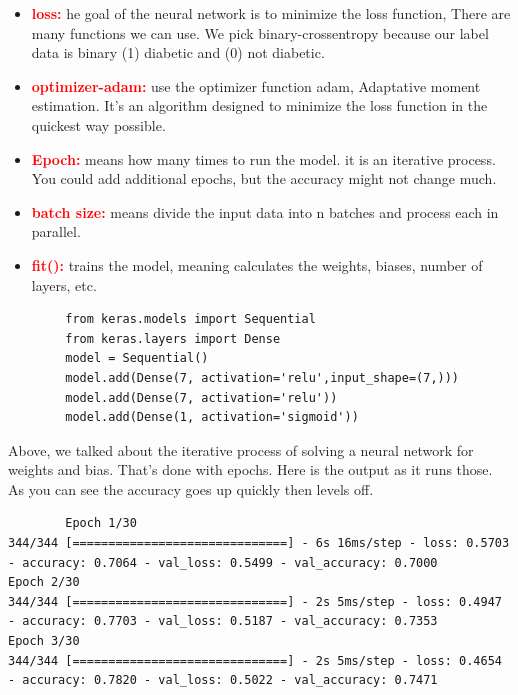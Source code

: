     \begin{itemize}
        \item \textbf{\textcolor{red}{\Large loss:}}
        he goal of the neural network is to minimize the loss function,
        There are many functions we can use. We pick binary-crossentropy 
        because our label data is binary (1) diabetic and (0) not diabetic.

        \item \textbf{\textcolor{red}{\Large optimizer-adam:}}
        use the optimizer function adam, Adaptative moment estimation.
        It’s an algorithm designed to minimize the loss function in the quickest way possible.

        \item \textbf{\textcolor{red}{\Large Epoch:}}
        means how many times to run the model. it is an iterative process.
         You could add additional epochs, but the accuracy might not change much. 
         
        \item \textbf{\textcolor{red}{\Large batch size:}}
         means divide the input data into n batches and process each in parallel.
        \item \textbf{\textcolor{red}{\Large fit():}}
        trains the model, meaning calculates the weights, biases, number of layers, etc.
    \end{itemize}
    
    \begin{lstlisting}
        from keras.models import Sequential
        from keras.layers import Dense
        model = Sequential()
        model.add(Dense(7, activation='relu',input_shape=(7,)))
        model.add(Dense(7, activation='relu'))
        model.add(Dense(1, activation='sigmoid'))   
    \end{lstlisting}
    Above, we talked about the iterative process of solving a neural network for weights and bias.
     That’s done with epochs. Here is the output as it runs those.
     As you can see the accuracy goes up quickly then levels off.
    
     \begin{lstlisting}
        Epoch 1/30
344/344 [==============================] - 6s 16ms/step - loss: 0.5703 - accuracy: 0.7064 - val_loss: 0.5499 - val_accuracy: 0.7000
Epoch 2/30
344/344 [==============================] - 2s 5ms/step - loss: 0.4947 - accuracy: 0.7703 - val_loss: 0.5187 - val_accuracy: 0.7353
Epoch 3/30
344/344 [==============================] - 2s 5ms/step - loss: 0.4654 - accuracy: 0.7820 - val_loss: 0.5022 - val_accuracy: 0.7471    
    \end{lstlisting}
    
